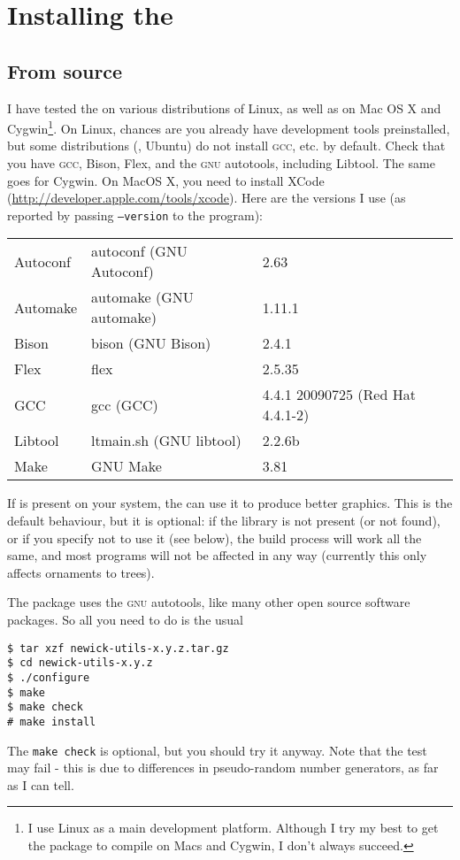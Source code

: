 \chapter{Installing the \nutils}

\section{From source}

I have tested the \nutils{} on various distributions of Linux, as well as on
Mac OS X and Cygwin\footnote{I use Linux as a main development platform.
Although I try my best to get the package to compile on Macs and Cygwin, I don't
always succeed.}. On Linux, chances are you already have development tools
preinstalled, but some distributions (\eg, Ubuntu) do not install \textsc{gcc},
etc. by default. Check that you have \textsc{gcc}, Bison, Flex, and the
\textsc{gnu} autotools, including Libtool. The same goes for Cygwin. On MacOS X,
you need to install XCode (\url{http://developer.apple.com/tools/xcode}).
Here are the versions I use (as reported by passing \texttt{--version} to the
program):

\medskip
\begin{tabular}{lll}
Autoconf	& autoconf (GNU Autoconf) & 2.63 \\
Automake	& automake (GNU automake) & 1.11.1 \\
Bison  		& bison (GNU Bison) 			& 2.4.1 \\ 
Flex			& flex 										& 2.5.35 \\
GCC 			& gcc (GCC) 							& 4.4.1 20090725 (Red Hat 4.4.1-2) \\
Libtool		& ltmain.sh (GNU libtool) & 2.2.6b \\
Make			& GNU Make 								& 3.81
\end{tabular}
\medskip

\noindent{}If \libxml{} is present on your system, the \nutils{} can use it to
produce better \svg{} graphics. This is the default behaviour, but it is
optional: if the library is not present (or not found), or if you specify not to
use it (see below), the build process will work all the same, and most programs
will not be affected in any way (currently this only affects ornaments to \svg{}
trees).

\noindent{}The package uses the \textsc{gnu} autotools, like many other open source
software packages. So all you need to do is the usual
\begin{verbatim}
$ tar xzf newick-utils-x.y.z.tar.gz
$ cd newick-utils-x.y.z
$ ./configure
$ make
$ make check
# make install
\end{verbatim}
The \texttt{make check} is optional, but you should try it anyway. Note that
the \gen{} test may fail - this is due to differences in pseudo-random number
generators, as far as I can tell.

